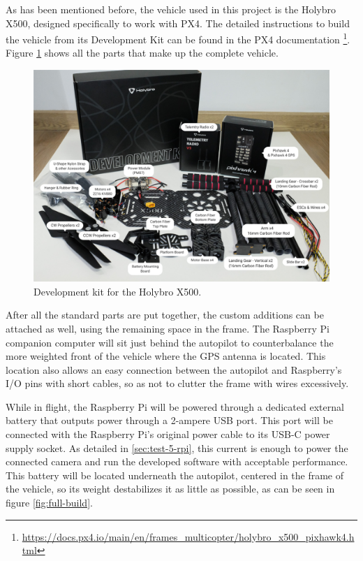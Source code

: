

As has been mentioned before, the vehicle used in this project is the Holybro X500, designed specifically to work with PX4.
The detailed instructions to build the vehicle from its Development Kit can be found in the PX4 documentation \footnote{\url{https://docs.px4.io/main/en/frames_multicopter/holybro_x500_pixhawk4.html}}.
Figure \ref{fig:x500-dev-kit} shows all the parts that make up the complete vehicle.

\begin{figure}
  \centering
  \includegraphics[width=.6\textwidth, keepaspectratio]{img/x500-dev-kit.jpg}
  \caption{Development kit for the Holybro X500.}
  \label{fig:x500-dev-kit}
\end{figure}


After all the standard parts are put together, the custom additions can be attached as well, using the remaining space in the frame.
The Raspberry Pi companion computer will sit just behind the autopilot to counterbalance the more weighted front of the vehicle where the GPS antenna is located.
This location also allows an easy connection between the autopilot and Raspberry's I/O pins with short cables, so as not to clutter the frame with wires excessively.

While in flight, the Raspberry Pi will be powered through a dedicated external battery that outputs power through a 2-ampere USB port.
This port will be connected with the Raspberry Pi's original power cable to its USB-C power supply socket.
As detailed in \ref{sec:test-5-rpi}, this current is enough to power the connected camera and run the developed software with acceptable performance.
This battery will be located underneath the autopilot, centered in the frame of the vehicle, so its weight destabilizes it as little as possible, as can be seen in figure \ref{fig:full-build}.

